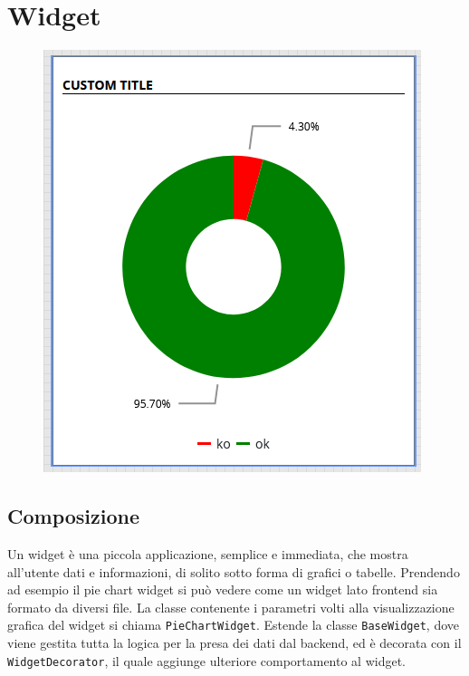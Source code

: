 \section{Widget}
\label{chap:widget}
\begin{figure}[h]
\centering
\includegraphics[scale=0.6]{images/widget_example.png}
\end{figure}
\subsection{Composizione}

Un widget è una piccola applicazione, semplice e immediata, che mostra all'utente dati e informazioni, di solito sotto forma di grafici o tabelle. \newline Prendendo ad esempio il pie chart widget si può vedere come un widget lato frontend sia formato da diversi file. La classe contenente i parametri volti alla visualizzazione grafica del widget si chiama \verb|PieChartWidget|. Estende la classe \verb|BaseWidget|, dove viene gestita tutta la logica per la presa dei dati dal backend, ed è decorata con il \verb|WidgetDecorator|, il quale aggiunge ulteriore comportamento al widget.



